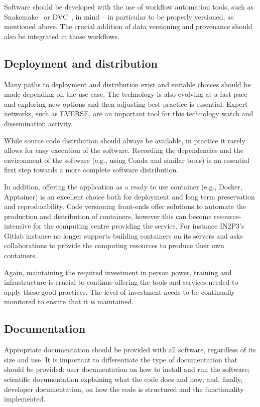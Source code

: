 Software should be developed with the use of workflow automation tools, such as Snakemake~\cite{snakemake} or DVC~\cite{The_DVC_team_and_contributors_DVC_Data_Version}, in mind -- in particular to be properly versioned, as mentioned above. The crucial addition of data versioning and provenance should also be integrated in those workflows. 

\subsection{Deployment and distribution}

Many paths to deployment and distribution exist and suitable choices should be made depending on the use case. The technology is also evolving at a fast pace and exploring new options and then adjusting best practice is essential. Expert networks, such as EVERSE, are an important tool for this technology watch and dissemination activity. 

While source code distribution should always be available, in practice it rarely allows for easy execution of the software. Recording the dependencies and the environment of the software (e.g., using Conda and similar tools) is an essential first step towards a more complete software distribution.

In addition, offering the application as a ready to use container (e.g., Docker, Apptainer) is an excellent choice both for deployment and long term preservation and reproducibility. Code versioning front-ends offer solutions to automate the production and distribution of containers, however this can become resource-intensive for the computing centre providing the service. For instance IN2P3's Gitlab instance no longer supports building containers on its servers and asks collaborations to provide the computing resources to produce their own containers.

Again, maintaining the required investment in person power, training and infrastructure is crucial to continue offering the tools and services needed to apply these good practices.  The level of investment needs to be continually monitored to ensure that it is maintained.


\subsection{Documentation}

Appropriate documentation should be provided with all software, regardless of its size and use. It is important to differentiate the type of documentation that should be provided: user documentation on how to install and run the software; scientific documentation explaining what the code does and how; and, finally, developer documentation, on how the code is structured and the functionality implemented.

